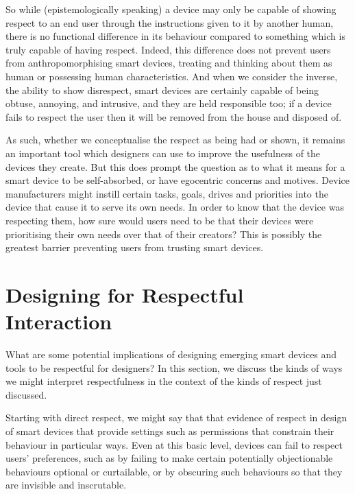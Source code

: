 \documentclass{IETpaper}
\begin{document}
So while (epistemologically speaking) a device may only be capable of showing respect to an end user through the instructions given to it by another human, there is no functional difference in its behaviour compared to something which is truly capable of having respect. Indeed, this difference does not prevent users from anthropomorphising smart devices, treating and thinking about them as human or possessing human characteristics. And when we consider the inverse, the ability to show disrespect, smart devices are certainly capable of being obtuse, annoying, and intrusive, and they are held responsible too; if a device fails to respect the user then it will be removed from the house and disposed of.

 As such, whether we conceptualise the respect as being had or shown, it remains an important tool which designers can use to improve the usefulness of the devices they create. But this does prompt the question as to what it means for a smart device to be self-absorbed, or have egocentric concerns and motives. Device manufacturers might instill certain tasks, goals, drives and priorities into the device that cause it to serve its own needs. In order to know that the device was respecting them, how sure would users need to be that their devices were prioritising their own needs over that of their creators? This is possibly the greatest barrier preventing users from trusting smart devices.


\section{Designing for Respectful Interaction}

What are some potential implications of designing emerging smart devices and tools to be respectful for designers?  In this section, we discuss the kinds of ways we might interpret respectfulness in the context of the kinds of respect just discussed.

Starting with direct respect, we might say that that evidence of respect in  design of smart devices that provide settings such as permissions that constrain their behaviour in particular ways. Even at this basic level, devices can fail to respect users' preferences, such as by failing to make certain potentially objectionable behaviours optional or curtailable, or by obscuring such behaviours so that they are invisible and inscrutable.  
\end{document}
